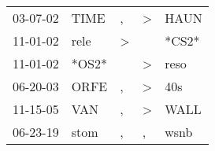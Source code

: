 \begin{supertabular}{lllll}
 03-07-02 &   TIME &             , &  \textgreater &   HAUN \\
 11-01-02 &   rele &  \textgreater &               &  *CS2* \\
 11-01-02 &  *OS2* &               &  \textgreater &   reso \\
 06-20-03 &   ORFE &             , &  \textgreater &    40s \\
 11-15-05 &    VAN &             , &  \textgreater &   WALL \\
 06-23-19 &   stom &             , &             , &   wsnb \\
\end{supertabular}

